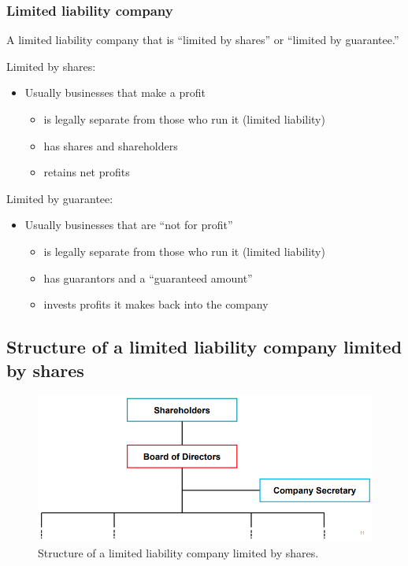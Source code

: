 \subsubsection{Limited liability company}
A limited liability company that is ``limited by shares'' or ``limited by guarantee.''

Limited by shares:
\begin{itemize}
    \item Usually businesses that make a profit
          \begin{itemize}
              \item is legally separate from those who run it (limited liability)
              \item has shares and shareholders
              \item retains net profits
          \end{itemize}
\end{itemize}

Limited by guarantee:
\begin{itemize}
    \item Usually businesses that are ``not for profit''
          \begin{itemize}
              \item is legally separate from those who run it (limited liability)
              \item has guarantors and a ``guaranteed amount''
              \item invests profits it makes back into the company
          \end{itemize}
\end{itemize}
\subsection{Structure of a limited liability company limited by shares}
\begin{figure}[H]
    \centering
    \includegraphics[width = \textwidth]{./img/figure26.png}
    \caption{Structure of a limited liability company limited by shares.}
\end{figure}
